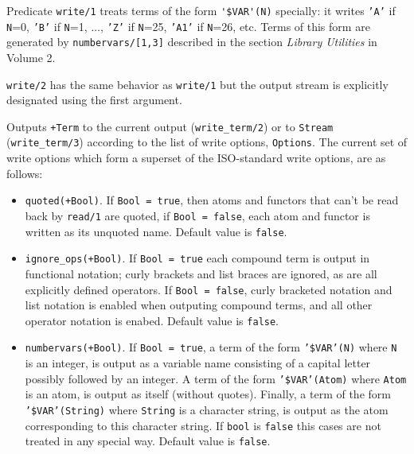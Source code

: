 \begin{description}
    Predicate {\tt write/1} treats terms of the form 
    \verb|'$VAR'(N)| specially:  it writes {\tt 'A'} if {\tt N}=0,
    {\tt 'B'} if {\tt N}=1, $\ldots$, {\tt 'Z'} if {\tt N}=25, {\tt 'A1'} 
    if {\tt N}=26, etc.  Terms of this form are generated by
    {\tt numbervars/[1,3]} described in the section {\it Library Utilities} in Volume 2.

	{\tt write/2} has the same behavior as {\tt write/1} but the
	output stream is explicitly designated using the first argument.

\vspace{-7mm} 

    Outputs {\tt +Term} to the current output ({\tt write\_term/2}) or
    to {\tt Stream} ({\tt write\_term/3}) according to the list of
    write options, {\tt Options}.  The current set of write options
    which form a superset of the ISO-standard write options, are as
    follows:
%
\begin{itemize}
%
\item {\tt quoted(+Bool)}.  If {\tt Bool = true}, then atoms and
    functors that can't be read back by {\tt read/1} are quoted, if
    {\tt Bool = false}, each atom and functor is written as its
    unquoted name. Default value is {\tt false}.
%
\item {\tt ignore\_ops(+Bool)}. If {\tt Bool = true} each compound term
is output in functional notation; curly brackets and list braces are
ignored, as are all explicitly defined operators.  If {\tt Bool =
false}, curly bracketed notation and list notation is enabled when
outputing compound terms, and all other operator notation is
enabed.  Default value is {\tt false}.
%
 \item {\tt numbervars(+Bool)}.  If {\tt Bool = true}, a term of the
form {\tt '\$VAR'(N)} where {\tt N} is an integer, is output as a
variable name consisting of a capital letter possibly followed by an
integer.  A term of the form {\tt '\$VAR'(Atom)} where {\tt Atom} is an
atom, is output as itself (without quotes).  Finally, a term of the
form {\tt '\$VAR'(String)} where {\tt String} is a character string, is
output as the atom corresponding to this character string.  If
{\tt bool} is {\tt false} this cases are not treated in any special
way.  Default value is {\tt false}.
%
%

\end{itemize}
\end{description}
